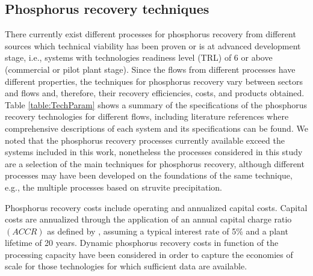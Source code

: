 \documentclass[authoryear]{elsarticle}
\begin{document}
\subsection{Phosphorus recovery techniques}
There currently exist different processes for phosphorus recovery from different sources which technical viability has been proven or is at advanced development stage, i.e., systems with technologies readiness level (TRL) \citep{TRLDefinitions} of 6 or above (commercial or pilot plant stage). Since the flows from different processes have different properties, the techniques for phosphorus recovery vary between sectors and flows and, therefore, their recovery efficiencies, costs, and products obtained. Table \ref{table:TechParam} shows a summary of the specifications of the phosphorus recovery technologies for different flows, including literature references where comprehensive descriptions of each system and its specifications can be found. We noted that the phosphorus recovery processes currently available exceed the systems included in this work, nonetheless the processes considered in this study are a selection of the main techniques for phosphorus recovery,
although different processes may have been developed on the foundations of the same technique,
e.g., the multiple processes based on struvite precipitation. 

Phosphorus recovery costs include operating and annualized capital costs. Capital costs are annualized through the application of an annual capital charge ratio $\left( ACCR\right)$ as defined by \citet{towler2013chemical}, assuming a typical interest rate of 5\% and a plant lifetime of 20 years. Dynamic phosphorus recovery costs in function of the processing capacity have been considered in order to capture the economies of scale for those technologies for which sufficient data are available.
\end{document}
